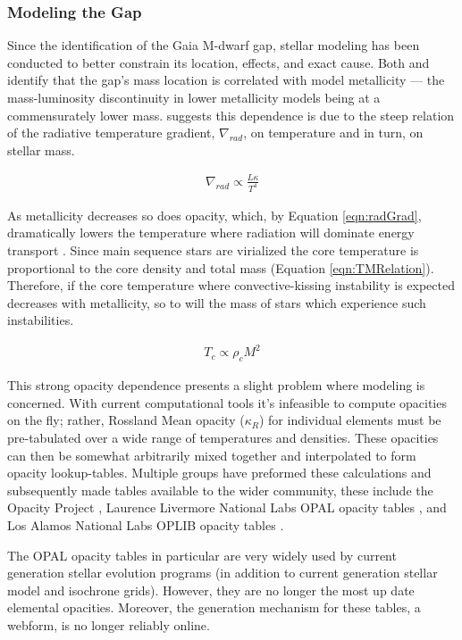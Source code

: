\subsubsection{Modeling the Gap}
Since the identification of the Gaia M-dwarf gap, stellar modeling has been
conducted to better constrain its location, effects, and exact cause.
Both \citet{Mansfield2021} and \citet{Feiden2021} identify that the gap's mass
location is correlated with model metallicity --- the mass-luminosity
discontinuity in lower metallicity models being at a commensurately lower mass.
\citet{Feiden2021} suggests this dependence is due to the steep relation of
the radiative temperature gradient, $\nabla_{rad}$, on temperature and in turn,
on stellar mass.

\begin{align}\label{eqn:radGrad}
	\nabla_{rad} \propto \frac{L\kappa}{T^{4}}
\end{align}

As metallicity decreases so does opacity, which, by Equation \ref{eqn:radGrad},
dramatically lowers the temperature where radiation will dominate energy transport
\citep{Chabrier1997}. Since main sequence stars are virialized the core
temperature is proportional to the core density and total mass (Equation
\ref{eqn:TMRelation}). Therefore, if the core temperature where
convective-kissing instability is expected decreases with metallicity, so to
will the mass of stars which experience such instabilities.

\begin{align}\label{eqn:TMRelation}
	T_{c} \propto \rho_{c}M^{2}
\end{align}

This strong opacity dependence presents a slight problem where modeling is 
concerned. With current computational tools it's infeasible to compute opacities on the
fly; rather, Rossland Mean opacity ($\kappa_{R}$) for individual elements must
be pre-tabulated over a wide range of temperatures and densities. These
opacities can then be somewhat arbitrarily mixed together and interpolated to
form opacity lookup-tables. Multiple groups have preformed these calculations
and subsequently made tables available to the wider community, these include
the Opacity Project \citep[OP][]{Seaton1994}, Laurence Livermore National Labs
OPAL opacity tables \citep{Iglesias1996}, and Los Alamos National Labs OPLIB
opacity tables \citep{Colgan2016}.

The OPAL opacity tables in particular are very widely used by current
generation stellar evolution programs (in addition to current generation
stellar model and isochrone grids). However, they are no longer the most up
date elemental opacities. Moreover, the generation mechanism for these tables,
a webform, is no longer reliably online.  

